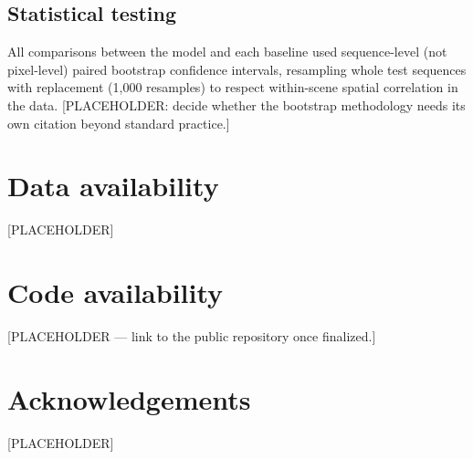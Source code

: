 \documentclass[pdflatex,sn-nature]{sn-jnl}%
\begin{document}
\subsection*{Statistical testing}

All comparisons between the model and each baseline used sequence-level
(not pixel-level) paired bootstrap confidence intervals, resampling
whole test sequences with replacement (1{,}000 resamples) to respect
within-scene spatial correlation in the data. [PLACEHOLDER: decide
whether the bootstrap methodology needs its own citation beyond
standard practice.]


\backmatter

\section*{Data availability}
[PLACEHOLDER]

\section*{Code availability}
[PLACEHOLDER --- link to the public repository once finalized.]

\section*{Acknowledgements}
[PLACEHOLDER]


\end{document}
